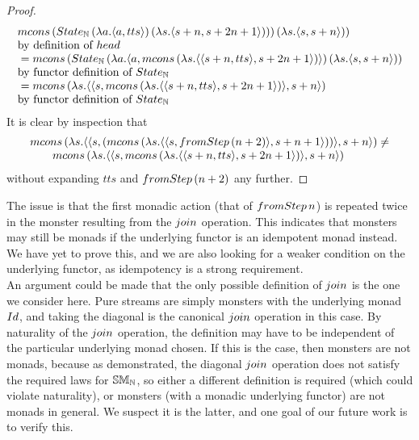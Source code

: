 \begin{proof}
$$\begin{array}{ll}
{\mcons\, (\state_{\nat} \,(\lambda a . \pair{a}{tts})\, (\lambda s . \pair{s + n}{s + 2n + 1}))
})\, (\lambda s. \pair{s}{s + n}))
\\ \mbox{by definition of } \head \\
{}= \mcons\, (\state_{\nat}\,(\lambda a . \pair{a}{  
\mcons\, (\lambda s . \pair{\pair{s + n}{tts}}{s + 2n + 1})
})\, (\lambda s. \pair{s}{s + n})) \\
\mbox{by functor definition of } \state_{\nat}  \\
{}= \mcons\, (\lambda s. \pair{\pair{s}{\mcons\, (\lambda s . \pair{\pair{s + n}{tts}}{s + 2n + 1})}}{s + n}) \\ 
\mbox{by functor definition of } \state_{\nat} \\
\end{array} 
$$
It is clear by inspection that 
$$
\begin{array}{l}
\mcons\, (\lambda s. \pair{\pair{s}{(\mcons\, (\lambda s. \pair{\pair{s}{\fromstepstr\, (n + 2)}}{s + n + 1}))}}{s + n}) \neq \\
\qquad \mcons\, (\lambda s. \pair{\pair{s}{\mcons\, (\lambda s . \pair{\pair{s + n}{tts}}{s + 2n + 1})}}{s + n})
\end{array} 
$$
without expanding $tts$ and $\fromstepstr\, (n + 2)$ any further.
\end{proof}

The issue is that the first monadic action (that of $\fromstepstr\, n$) is repeated twice in the monster resulting from the $\join$ operation. 
This indicates that monsters may still be monads if the underlying functor is an idempotent monad instead. 
We have yet to prove this, and we are also looking for a weaker condition on the underlying functor, as idempotency is a strong requirement. \\

An argument could be made that the only possible definition of $\join$ is the one we consider here. Pure streams are simply monsters with the underlying monad $\Id$, and taking the diagonal is the canonical $\join$ operation in this case. By naturality of the $\join$ operation, the definition may have to be independent of the particular underlying monad chosen. If this is the case, then monsters are not monads, because as demonstrated, the diagonal $\join$ operation does not satisfy the required laws for $\mathbb{SM}_{\mathbb{N}}$, so either a different definition is required (which could violate naturality), or monsters (with a monadic underlying functor) are not monads in general. We suspect it is the latter, and one goal of our future work is to verify this.
